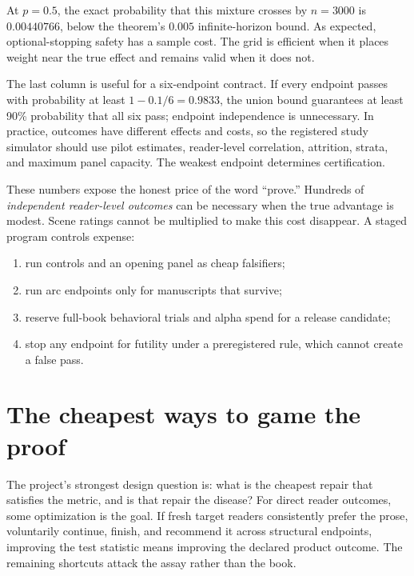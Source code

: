 \documentclass[11pt]{article}
\theoremstyle{remark}
\begin{document}
At $p=0.5$, the exact probability that this mixture crosses by $n=3000$ is $0.00440766$,
below the theorem's $0.005$ infinite-horizon bound. As expected, optional-stopping safety has
a sample cost. The grid is efficient when it places weight near the true effect and remains
valid when it does not.

The last column is useful for a six-endpoint contract. If every endpoint passes with
probability at least $1-0.1/6=0.9833$, the union bound guarantees at least 90\% probability
that all six pass; endpoint independence is unnecessary. In practice, outcomes have
different effects and costs, so the registered study simulator should use pilot estimates,
reader-level correlation, attrition, strata, and maximum panel capacity. The weakest
endpoint determines certification.

These numbers expose the honest price of the word ``prove.'' Hundreds of \emph{independent
reader-level outcomes} can be necessary when the true advantage is modest. Scene ratings
cannot be multiplied to make this cost disappear. A staged program controls expense:

\begin{enumerate}
  \item run controls and an opening panel as cheap falsifiers;
  \item run arc endpoints only for manuscripts that survive;
  \item reserve full-book behavioral trials and alpha spend for a release candidate;
  \item stop any endpoint for futility under a preregistered rule, which cannot create a false
  pass.
\end{enumerate}

\section{The cheapest ways to game the proof}

The project's strongest design question is: what is the cheapest repair that satisfies the
metric, and is that repair the disease? For direct reader outcomes, some optimization is the
goal. If fresh target readers consistently prefer the prose, voluntarily continue, finish,
and recommend it across structural endpoints, improving the test statistic means improving
the declared product outcome. The remaining shortcuts attack the assay rather than the book.
\end{document}
